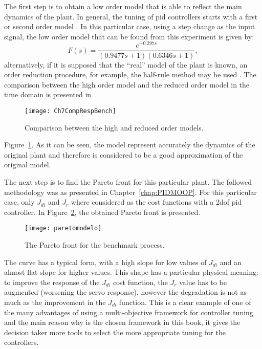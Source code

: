 The first step is to obtain a low order model that is able to reflect the main dynamics of the plant. In general, the tuning of \gls{pid} controllers starts with a first or second order model \citep{Alfaro2006}. In this particular case, using a step change as the input signal, the low order model that can be found from this experiment is given by:
%
\begin{equation}
F(s)=\frac{e^{-0.297s}}{(0.9477s+1)(0.6346s+1)},
\label{eq:BenchTFfit}
\end{equation}
%
alternatively, if it is supposed that the ``real'' model of the plant is known, an order reduction procedure, for example, the half-rule method may be used \citep{Skogestad2003}. The comparison between the high order model and the reduced order model in the time domain is presented in %
\begin{figure}[tb]
	\centering
	\texttt{[image: Ch7CompRespBench]}
	\caption{Comparison between the high and reduced order models.}
	\label{fig:Ch7CompRespBench}
\end{figure}
%
Figure~\ref{fig:Ch7CompRespBench}. As it can be seen, the model represent accurately the dynamics of the original plant and therefore is considered to be a good approximation of the original model.

The next step is to find the Pareto front for this particular plant. The followed methodology was as presented in Chapter~\ref{chap:PIDMOOP}. For this particular case, only $J_{di}$ and $J_r$ where considered as the cost functions with a \gls{2dof} \gls{pid} controller. In Figure~\ref{fig:paretomodelo}, the obtained Pareto front is presented. 
\begin{figure}[tb]%
	\centering
	\texttt{[image: paretomodelo]}%
	\caption{The Pareto front for the benchmark process.}%
	\label{fig:paretomodelo}%
\end{figure}

The curve has a typical form, with a high slope for low values of $J_{di}$ and an almost flat slope for higher values. This shape has a particular physical meaning: to improve the response of the $J_{di}$ cost function, the $J_{r}$ value has to be augmented (worsening the servo response), however the degradation is not as much as the improvement in the $J_{di}$ function. This is a clear example of one of the many advantages of using a multi-objective framework for controller tuning and the main reason why is the chosen framework in this book, it gives the decision taker more tools to select the more appropriate tuning for the controllers.

